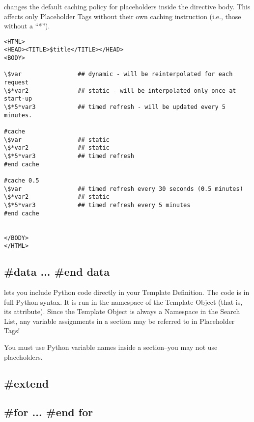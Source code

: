 { changes the default caching policy for placeholders inside the
directive body.  This affects only Placeholder Tags without their own caching
instruction (i.e., those without a ``*'').

\begin{verbatim}
<HTML>
<HEAD><TITLE>$title</TITLE></HEAD>
<BODY>

\$var                ## dynamic - will be reinterpolated for each request
\$*var2              ## static - will be interpolated only once at start-up
\$*5*var3            ## timed refresh - will be updated every 5 minutes.

#cache
\$var                ## static
\$*var2              ## static
\$*5*var3            ## timed refresh
#end cache

#cache 0.5
\$var                ## timed refresh every 30 seconds (0.5 minutes)
\$*var2              ## static
\$*5*var3            ## timed refresh every 5 minutes
#end cache


</BODY>
</HTML>
\end{verbatim}


\subsection{\#data ... \#end data}

 lets you include Python code directly in your Template 
Definition.  The code is in full Python syntax.  It is run in the namespace of
the Template Object (that is, its  attribute).  Since the Template
Object is always a Namespace in the Search List, any variable assignments in a
 section may be referred to in Placeholder Tags!

You must use Python variable names inside a  section--you may not
use placeholders.

\subsection{\#extend}



\subsection{\#for ... \#end for}

}
